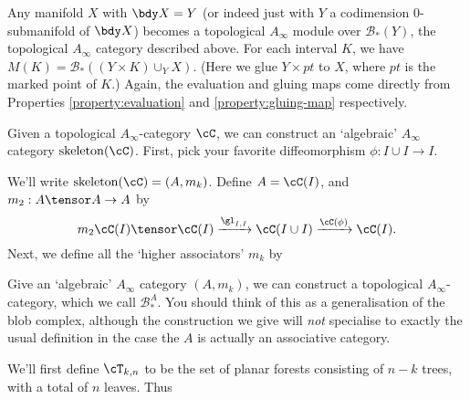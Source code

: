 \documentclass[11pt,leqno]{amsart}
\def\bc{{\mathcal B}}
\begin{document}
Any manifold $X$ with $\bdy X = Y$ (or indeed just with $Y$ a codimension $0$-submanifold of $\bdy X$) becomes a topological $A_\infty$ module over
$\bc_*(Y)$, the topological $A_\infty$ category described above. For each interval $K$, we have $M(K) = \bc_*((Y \times K) \cup_Y X)$.
(Here we glue $Y \times pt$ to $X$, where $pt$ is the marked point of $K$.) Again, the evaluation and gluing maps come directly from Properties
\ref{property:evaluation} and \ref{property:gluing-map} respectively.





\newcommand{\skel}[1]{\operatorname{skeleton}(#1)}

Given a topological $A_\infty$-category $\cC$, we can construct an `algebraic' $A_\infty$ category $\skel{\cC}$. First, pick your
favorite diffeomorphism $\phi: I \cup I \to I$.
\begin{defn}
We'll write $\skel{\cC} = (A, m_k)$. Define $A = \cC(I)$, and $m_2 : A \tensor A \to A$ by
\begin{equation*}
m_2 \cC(I) \tensor \cC(I) \xrightarrow{\gl_{I,I}} \cC(I \cup I) \xrightarrow{\cC(\phi)} \cC(I).
\end{equation*}
Next, we define all the `higher associators' $m_k$ by
\todo{}
\end{defn}

Give an `algebraic' $A_\infty$ category $(A, m_k)$, we can construct a topological $A_\infty$-category, which we call $\bc_*^A$. You should
think of this as a generalisation of the blob complex, although the construction we give will \emph{not} specialise to exactly the usual definition
in the case the $A$ is actually an associative category.

We'll first define $\cT_{k,n}$ to be the set of planar forests consisting of $n-k$ trees, with a total of $n$ leaves. Thus
\begin{align*}
\end{align*}
\end{document}
